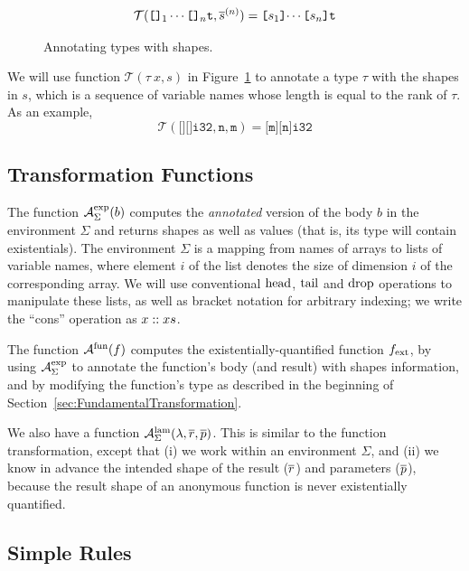 \begin{figure}[bt]

\begin{align*}
  \mathcal{T}(\texttt{[]}_{1}\cdots\texttt{[]}_n\texttt{t},\overline{s}^{(n)}) = \texttt{[$s_{1}$]$\cdots$[$s_{n}$]\texttt{t}}
\end{align*}%
\caption{Annotating types with shapes.}
\label{fig:annotating bindings}
\end{figure}

We will use function \(\mathcal{T}(\tau~x,s)\) in
Figure~\ref{fig:annotating bindings} to annotate a type \(\tau\) with
the shapes in \(s\), which is a sequence of variable names whose
length is equal to the rank of \(\tau\).  As an example,
\[
\mathcal{T}(\texttt{[][]i32}, \texttt{n}, \texttt{m}) = \texttt{[m][n]i32}
\]

\subsection{Transformation Functions}
\label{sec:TransformationFunctions}

The function \(\mathcal{A}_{\Sigma}^{\text{exp}}(b)\) computes the \textit{annotated}
version of the body \(b\) in the environment \(\Sigma\) and returns
shapes as well as values (that is, its type will contain
existentials).  The environment \(\Sigma\) is a mapping from names of
arrays to lists of variable names, where element \(i\) of the list
denotes the size of dimension \(i\) of the corresponding array.  We
will use conventional \(\textrm{head}\), \(\textrm{tail}\) and \(\textrm{drop}\) operations to
manipulate these lists, as well as bracket notation for arbitrary
indexing; we write the ``cons'' operation as \(x :: xs\).

The function \(\mathcal{A}^{\text{fun}}(f)\) computes the existentially-quantified 
function \(f_{\textrm{ext}}\), by using  \(\mathcal{A}_{\Sigma}^{\text{exp}}\) to annotate
the function's body (and result) with shapes information, and by modifying
the function's type as described in the beginning of
Section~\ref{sec:FundamentalTransformation}.

We also have a function
\(\mathcal{A}_{\Sigma}^{\text{lam}}(\lambda,\overline{r},\overline{p})\).  This is
similar to the function transformation, except that (i) we work within
an environment \(\Sigma\), and (ii) we know in advance the intended shape
of the result (\(\overline{r}\)) and parameters
(\(\overline{p}\)), because the result shape of an anonymous function
is never existentially quantified.

\subsection{Simple Rules}
\label{sec:SimpleRules}

